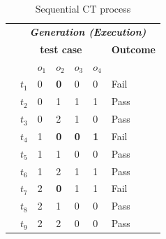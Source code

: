 \documentclass[journal,12pt,onecolumn,draftclsnofoot,]{IEEEtran}
\begin{document}
\begin{table}[ht]
\caption{Sequential CT process}
\label{tradition-gi}
\centering
\begin{tabular}{lllllll}
                                       & \multicolumn{6}{c}{\bfseries \emph{Generation (Execution)}}                                                                                                                                                                                                                                  \\ \cline{2-7}
                                       & \multicolumn{5}{c|}{\bfseries test case}                                                                                                                                                                                                              & \bfseries Outcome \\
                                       & &$o_{1}$ & $o_{2}$& $o_{3}$& \multicolumn{1}{c|}{$o_{4}$}&  \\    \cline{2-7}
                                       & \multicolumn{1}{l|}{$t_{1}$}   & 0& \textbf{0}& 0& \multicolumn{1}{l|}{0}     & Fail              \\
                                       & \multicolumn{1}{l|}{$t_{2}$}   & 0& 1& 1& \multicolumn{1}{l|}{1}     & Pass              \\
                                       & \multicolumn{1}{l|}{$t_{3}$}   & 0& 2& 1& \multicolumn{1}{l|}{0}     & Pass              \\
                                       & \multicolumn{1}{l|}{$t_{4}$}   & 1& \textbf{0}& \textbf{0}& \multicolumn{1}{l|}{\textbf{1}}     & Fail              \\
                                       & \multicolumn{1}{l|}{$t_{5}$}   & 1& 1& 0& \multicolumn{1}{l|}{0}     & Pass              \\
                                       & \multicolumn{1}{l|}{$t_{6}$}   & 1& 2& 1& \multicolumn{1}{l|}{1}     & Pass              \\
                                       & \multicolumn{1}{l|}{$t_{7}$}   & 2& \textbf{0}& 1& \multicolumn{1}{l|}{1}     & Fail              \\
                                       & \multicolumn{1}{l|}{$t_{8}$}   & 2& 1& 0& \multicolumn{1}{l|}{0}     & Pass              \\
                                       & \multicolumn{1}{l|}{$t_{9}$}   & 2& 2& 0& \multicolumn{1}{l|}{0}     & Pass              \\ \cline{2-7}

\end{tabular}
\end{table}
\end{document}
